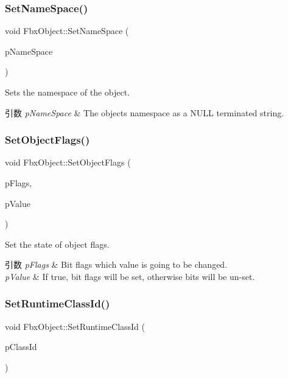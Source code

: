 \subsubsection{\texorpdfstring{Set\+Name\+Space()}{SetNameSpace()}}
{\footnotesize\ttfamily void Fbx\+Object\+::\+Set\+Name\+Space (\begin{DoxyParamCaption}\item[{\hyperlink{class_fbx_string}{Fbx\+String}}]{p\+Name\+Space }\end{DoxyParamCaption})}

Sets the namespace of the object. 
\begin{DoxyParams}{引数}
{\em p\+Name\+Space} & The object\textquotesingle{}s namespace as a {\ttfamily N\+U\+LL} terminated string. \\
\hline
\end{DoxyParams}
\mbox{\label{class_fbx_object_a38333e180ca371f76495267a26cccb08}} 
\subsubsection{\texorpdfstring{Set\+Object\+Flags()}{SetObjectFlags()}}
{\footnotesize\ttfamily void Fbx\+Object\+::\+Set\+Object\+Flags (\begin{DoxyParamCaption}\item[{\hyperlink{class_fbx_object_a117b8002963e9fe475a93556c217b244}{E\+Object\+Flag}}]{p\+Flags,  }\item[{bool}]{p\+Value }\end{DoxyParamCaption})}

Set the state of object flags. 
\begin{DoxyParams}{引数}
{\em p\+Flags} & Bit flags which value is going to be changed. \\
\hline
{\em p\+Value} & If {\ttfamily true}, bit flags will be set, otherwise bits will be un-\/set. \\
\hline
\end{DoxyParams}
\mbox{\label{class_fbx_object_af9273215e168b14d12a4a3e393e061c9}} 
\subsubsection{\texorpdfstring{Set\+Runtime\+Class\+Id()}{SetRuntimeClassId()}}
{\footnotesize\ttfamily void Fbx\+Object\+::\+Set\+Runtime\+Class\+Id (\begin{DoxyParamCaption}\item[{const \hyperlink{class_fbx_class_id}{Fbx\+Class\+Id} \&}]{p\+Class\+Id }\end{DoxyParamCaption})}

